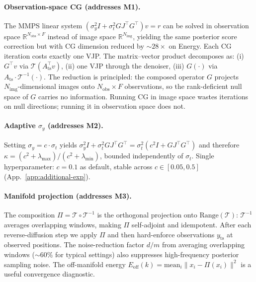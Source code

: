 \documentclass{article}
\theoremstyle{plain}
\theoremstyle{definition}
\theoremstyle{remark}
\newcommand{\tsimg}{\mathcal{T}}
\newcommand{\imgts}{\mathcal{T}^{-1}}
\newcommand{\Nimg}{N_{\mathrm{img}}}
\newcommand{\Nobs}{N_{\mathrm{obs}}}
\newcommand{\Ats}{A_{\mathrm{ts}}}
\newcommand{\yts}{y_{\mathrm{ts}}}
\begin{document}
\paragraph{Observation-space CG (addresses M1).}
\label{subsec:obs-cg}
The MMPS linear system $(\sigma_y^2 I + \sigma_t^2 G J^\top G^\top) v = r$ can be solved in observation space $\mathbb{R}^{\Nobs \times F}$ instead of image space $\mathbb{R}^{\Nimg}$, yielding the same posterior score correction but with CG dimension reduced by $\sim 28\times$ on Energy. Each CG iteration costs exactly one VJP. The matrix--vector product decomposes as: (i) $G^\top v$ via $\tsimg(\Ats^\top v)$, (ii) one VJP through the denoiser, (iii) $G(\cdot)$ via $\Ats \cdot \imgts(\cdot)$. The reduction is principled: the composed operator $G$ projects $\Nimg$-dimensional images onto $\Nobs \times F$ observations, so the rank-deficient null space of $G$ carries no information. Running CG in image space wastes iterations on null directions; running it in observation space does not.

\paragraph{Adaptive $\sigma_y$ (addresses M2).}
Setting $\sigma_y = c \cdot \sigma_t$ yields $\sigma_y^2 I + \sigma_t^2 G J^\top G^\top = \sigma_t^2 (c^2 I + G J^\top G^\top)$ and therefore $\kappa = (c^2 + \lambda_{\max})/(c^2 + \lambda_{\min})$, bounded independently of $\sigma_t$. Single hyperparameter: $c = 0.1$ as default, stable across $c \in [0.05, 0.5]$ (App.~\ref{app:additional-exp}).

\paragraph{Manifold projection (addresses M3).}
The composition $\Pi = \tsimg \circ \imgts$ is the orthogonal projection onto $\mathrm{Range}(\tsimg)$: $\imgts$ averages overlapping windows, making $\Pi$ self-adjoint and idempotent. After each reverse-diffusion step we apply $\Pi$ and then hard-enforce observations $\yts$ at observed positions. The noise-reduction factor $d/m$ from averaging overlapping windows (${\sim} 60\%$ for typical settings) also suppresses high-frequency posterior sampling noise. The off-manifold energy $E_{\mathrm{off}}(k) = \mathrm{mean}_i \|x_i - \Pi(x_i)\|^2$ is a useful convergence diagnostic.
\end{document}
